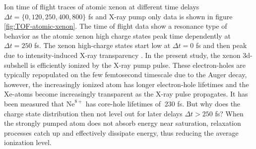 Ion time of flight traces of atomic xenon at different time delays $\Delta t = \{0, 120, 250, 400, 800\}$ fs and X-ray pump only data is shown in figure \ref{fig:TOF-atomic-xenon}. The time of flight data show a resonance type of behavior as the atomic xenon high charge states peak time dependently at $\Delta t = 250$ fs. The xenon high-charge states start low at $\Delta t = 0$ fs and then peak due to intensity-induced X-ray transparency \citep{Young-2010-Nature,Schorb-2012-PRL}. In the present study, the xenon 3d-subshell is efficiently ionized by the X-ray pump pulse. These electron-holes are typically repopulated on the few femtosecond timescale due to the Auger decay, however, the increasingly ionized atom has longer electron-hole lifetimes and the Xe-atoms become increasingly transparent as the X-ray pulse propagates. It has been measured that $\text{Ne}^{8+}$ has core-hole lifetimes of $~230$ fs. But why does the charge state distribution then not level out for later delays $\Delta t > 250$ fs? When the strongly pumped atom does not absorb energy near saturation, relaxation processes catch up and effectively dissipate energy, thus reducing the average ionization level.\\
